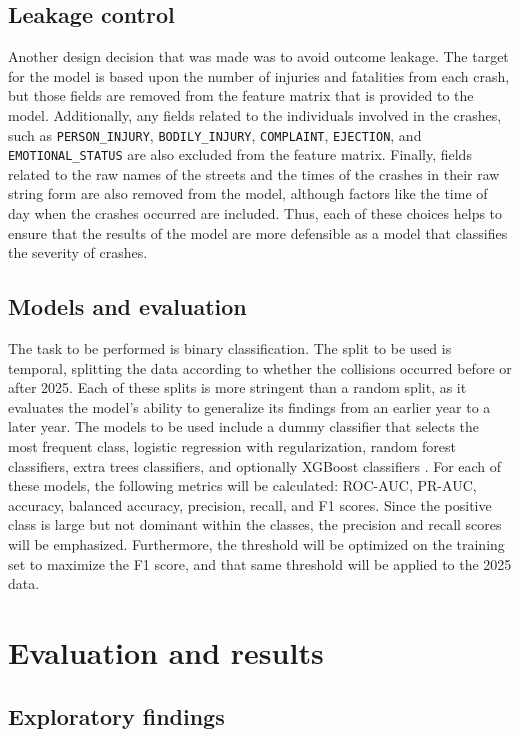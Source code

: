\documentclass{article}
\begin{document}
\subsection{Leakage control}

Another design decision that was made was to avoid outcome leakage. The target for the model is based upon the number of injuries and fatalities from each crash, but those fields are removed from the feature matrix that is provided to the model. Additionally, any fields related to the individuals involved in the crashes, such as \texttt{PERSON\_INJURY}, \texttt{BODILY\_INJURY}, \texttt{COMPLAINT}, \texttt{EJECTION}, and \texttt{EMOTIONAL\_STATUS} are also excluded from the feature matrix. Finally, fields related to the raw names of the streets and the times of the crashes in their raw string form are also removed from the model, although factors like the time of day when the crashes occurred are included. Thus, each of these choices helps to ensure that the results of the model are more defensible as a model that classifies the severity of crashes.

\subsection{Models and evaluation}
The task to be performed is binary classification. The split to be used is temporal, splitting the data according to whether the collisions occurred before or after 2025. Each of these splits is more stringent than a random split, as it evaluates the model’s ability to generalize its findings from an earlier year to a later year. The models to be used include a dummy classifier that selects the most frequent class, logistic regression with regularization, random forest classifiers, extra trees classifiers, and optionally XGBoost classifiers \citep{breiman2001random,xgboost,sklearn}. For each of these models, the following metrics will be calculated: ROC-AUC, PR-AUC, accuracy, balanced accuracy, precision, recall, and F1 scores. Since the positive class is large but not dominant within the classes, the precision and recall scores will be emphasized. Furthermore, the threshold will be optimized on the training set to maximize the F1 score, and that same threshold will be applied to the 2025 data.

\section{Evaluation and results}
\subsection{Exploratory findings}
\end{document}
